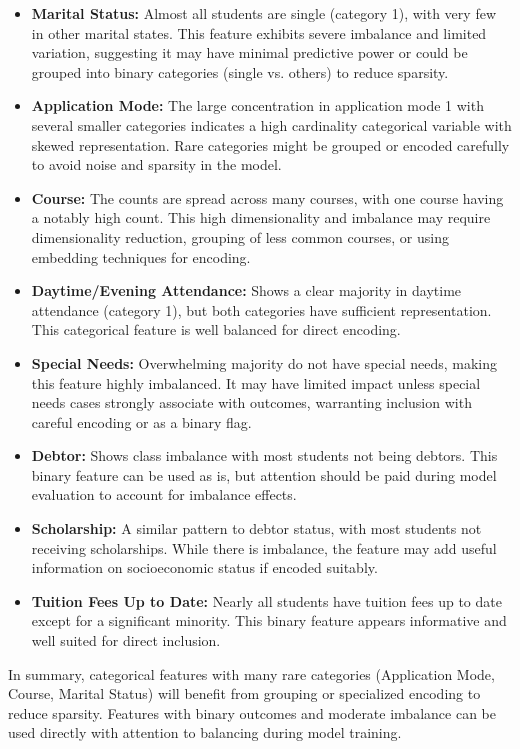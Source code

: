 \documentclass[twoside,final]{hcmut-report}
\begin{document}
\begin{itemize}
  \item \textbf{Marital Status:} Almost all students are single (category 1), with very few in other marital states. This feature exhibits severe imbalance and limited variation, suggesting it may have minimal predictive power or could be grouped into binary categories (single vs. others) to reduce sparsity.
  \item \textbf{Application Mode:} The large concentration in application mode 1 with several smaller categories indicates a high cardinality categorical variable with skewed representation. Rare categories might be grouped or encoded carefully to avoid noise and sparsity in the model.
  \item \textbf{Course:} The counts are spread across many courses, with one course having a notably high count. This high dimensionality and imbalance may require dimensionality reduction, grouping of less common courses, or using embedding techniques for encoding.
  \item \textbf{Daytime/Evening Attendance:} Shows a clear majority in daytime attendance (category 1), but both categories have sufficient representation. This categorical feature is well balanced for direct encoding.
  \item \textbf{Special Needs:} Overwhelming majority do not have special needs, making this feature highly imbalanced. It may have limited impact unless special needs cases strongly associate with outcomes, warranting inclusion with careful encoding or as a binary flag.
  \item \textbf{Debtor:} Shows class imbalance with most students not being debtors. This binary feature can be used as is, but attention should be paid during model evaluation to account for imbalance effects.
  \item \textbf{Scholarship:} A similar pattern to debtor status, with most students not receiving scholarships. While there is imbalance, the feature may add useful information on socioeconomic status if encoded suitably.
  \item \textbf{Tuition Fees Up to Date:} Nearly all students have tuition fees up to date except for a significant minority. This binary feature appears informative and well suited for direct inclusion.
\end{itemize}

In summary, categorical features with many rare categories (Application Mode, Course, Marital Status) will benefit from grouping or specialized encoding to reduce sparsity. Features with binary outcomes and moderate imbalance can be used directly with attention to balancing during model training.
\end{document}
